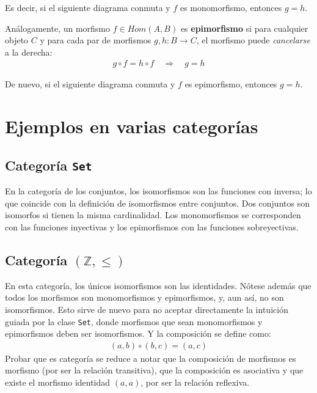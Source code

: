 \documentclass[11pt, fleqn, spanish]{book}
\begin{document}
    Es decir, si el siguiente diagrama conmuta y $f$ es monomorfismo, entonces $g=h$.
    \begin{center}
    \end{center}
    
    \begin{definition} 
      Análogamente, un morfismo $f \in Hom(A,B)$ es \textbf{epimorfismo} si para cualquier objeto $C$ y
      para cada par de morfismos $g,h: B \rightarrow C$, el morfismo puede \textit{cancelarse} a la derecha:
      \begin{gather*}
	g \circ f = h \circ f \quad \Rightarrow \quad g = h
      \end{gather*}
    \end{definition}

    De nuevo, si el siguiente diagrama conmuta y $f$ es epimorfismo, entonces $g=h$.
    \begin{center}
    \end{center}
    
  \section {Ejemplos en varias categorías}
    \subsection{Categoría \texttt{Set}}
      En la categoría de los conjuntos, los isomorfismos son las funciones con inversa; lo
      que coincide con la definición de isomorfismos entre conjuntos. Dos conjuntos son
      isomorfos si tienen la misma cardinalidad.
      Los monomorfismos se corresponden con las funciones inyectivas y los epimorfismos con
      las funciones sobreyectivas.
    
    \subsection{Categoría \texttt{$(\mathbb{Z},\leq)$}}
      En esta categoría, los únicos isomorfismos son las identidades. Nótese además
      que todos los morfismos son monomorfismos y epimorfismos, y, aun así, no son
      isomorfismos. Esto sirve de nuevo para no aceptar directamente la intuición
      guiada por la clase \texttt{Set}, donde morfismos que sean monomorfismos y
      epimorfismos deben ser isomorfismos.
      Y la composición se define como:
      \begin{align*}
       (a,b) \circ (b,c) = (a,c)
      \end{align*}
      Probar que es categoría se reduce a notar que la composición de morfismos es morfismo (por
      ser la relación transitiva), que la composición es asociativa y que existe el morfismo identidad
      $(a,a)$, por ser la relación reflexiva.
     
\end{document}
